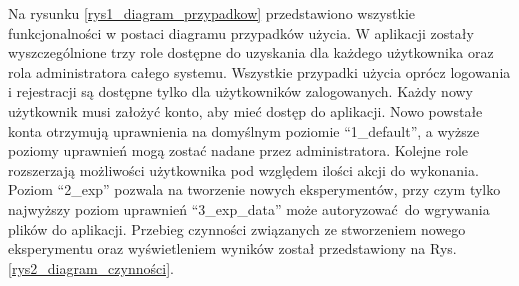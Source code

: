 Na rysunku \ref{rys1_diagram_przypadkow} przedstawiono wszystkie funkcjonalności w postaci diagramu przypadków użycia. W aplikacji zostały wyszczególnione trzy role dostępne do uzyskania dla każdego użytkownika oraz rola administratora całego systemu. Wszystkie przypadki użycia oprócz logowania i rejestracji są dostępne tylko dla użytkowników zalogowanych. Każdy nowy użytkownik musi założyć konto, aby mieć dostęp do aplikacji. Nowo powstałe konta otrzymują uprawnienia na domyślnym poziomie \enquote{1\_default}, a wyższe poziomy uprawnień mogą zostać nadane przez administratora. Kolejne role rozszerzają możliwości użytkownika pod względem ilości akcji do wykonania. Poziom \enquote{2\_exp} pozwala na tworzenie nowych eksperymentów, przy czym tylko najwyższy poziom uprawnień \enquote{3\_exp\_data}  może autoryzować do wgrywania plików do aplikacji. Przebieg czynności związanych ze stworzeniem nowego eksperymentu oraz wyświetleniem wyników został przedstawiony na Rys. \ref{rys2_diagram_czynności}. 



